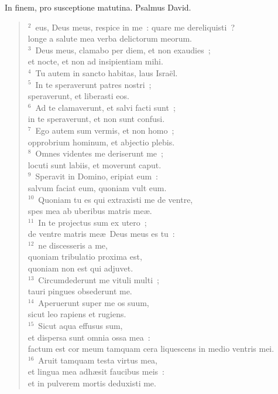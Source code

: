 \bchapter[Psalm]
In finem, pro susceptione matutina. Psalmus David.
\begin{verse}${}^{2}$~eus, Deus meus, respice in me~: quare me dereliquisti~?\\ longe a salute mea verba delictorum meorum.\\
${}^{3}$~Deus meus, clamabo per diem, et non exaudies~;\\ et nocte, et non ad insipientiam mihi.\\
${}^{4}$~Tu autem in sancto habitas, laus Isra\"el.\\
${}^{5}$~In te speraverunt patres nostri~;\\ speraverunt, et liberasti eos.\\
${}^{6}$~Ad te clamaverunt, et salvi facti sunt~;\\ in te speraverunt, et non sunt confusi.\\
${}^{7}$~Ego autem sum vermis, et non homo~;\\ opprobrium hominum, et abjectio plebis.\\
${}^{8}$~Omnes videntes me deriserunt me~;\\ locuti sunt labiis, et moverunt caput.\\
${}^{9}$~Speravit in Domino, eripiat eum~:\\ salvum faciat eum, quoniam vult eum.\\
${}^{10}$~Quoniam tu es qui extraxisti me de ventre,\\ spes mea ab uberibus matris me\ae .\\
${}^{11}$~In te projectus sum ex utero~;\\ de ventre matris me\ae\ Deus meus es tu~:\\
${}^{12}$~ne discesseris a me,\\ quoniam tribulatio proxima est,\\ quoniam non est qui adjuvet.\\
${}^{13}$~Circumdederunt me vituli multi~;\\ tauri pingues obsederunt me.\\
${}^{14}$~Aperuerunt super me os suum,\\ sicut leo rapiens et rugiens.\\
${}^{15}$~Sicut aqua effusus sum,\\ et dispersa sunt omnia ossa mea~:\\ factum est cor meum tamquam cera liquescens in medio ventris mei.\\
${}^{16}$~Aruit tamquam testa virtus mea,\\ et lingua mea adh\ae sit faucibus meis~:\\ et in pulverem mortis deduxisti me.\\

\end{verse}
